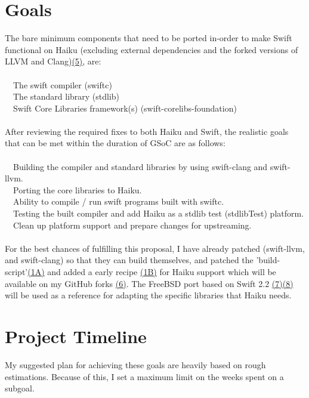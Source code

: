 \documentclass[12pt]{article}
\begin{document}
\section*{Goals}
The bare minimum components that need to be ported in-order to make Swift functional on Haiku (excluding external dependencies and the forked versions of LLVM and Clang)\hyperlink{(5)}{(5)}, are: 
\\\\
\textbullet \ \ The swift compiler (swiftc) \\
\textbullet \ \ The standard library (stdlib) \\ \textbullet \ \ Swift Core Libraries framework(s) (swift-corelibs-foundation)
\\
\\
After reviewing the required fixes to both Haiku and Swift, the realistic goals that can be met within the duration of GSoC are as follows: 
\\
\\
\textbullet \ \ Building the compiler and standard libraries by using swift-clang and swift-llvm. \\
\textbullet \ \ Porting the core libraries to Haiku.  \\
\textbullet \ \ Ability to compile / run swift programs built with swiftc. \\
\textbullet \ \ Testing the built compiler and add Haiku as a stdlib test (stdlibTest) platform. \\
\textbullet \ \ Clean up platform support and prepare changes for upstreaming.
\\\\
For the best chances of fulfilling this proposal, I have already patched (swift-llvm, and swift-clang) so that they can build themselves, and patched the 'build-script'\hyperlink{(1A)}{(1A)} and added a early recipe \hyperlink{(1B)}{(1B)} for Haiku support which will be available on my GitHub forks \hyperlink{(6)}{(6)}. The FreeBSD port based on Swift 2.2 \hyperlink{(7)}{(7)}\hyperlink{(8)}{(8)} will be used as a reference for adapting the specific libraries that Haiku needs.  

\section*{Project Timeline}

My suggested plan for achieving these goals are heavily based on rough estimations. Because of this, I set a maximum limit on the weeks spent on a subgoal. 
\end{document}
